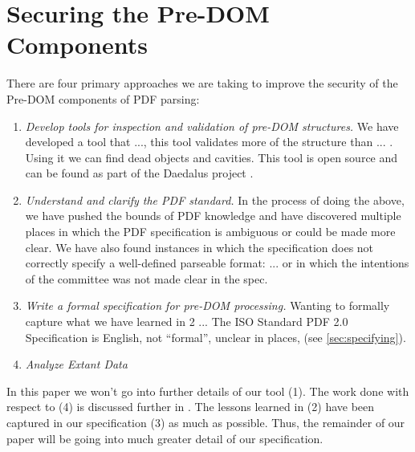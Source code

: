 \section{Securing the Pre-DOM Components }
\label{sec:securing}


There are four primary approaches we are taking to improve the security of the
Pre-DOM components of PDF parsing:
\begin{enumerate}
\item
  \emph{Develop tools for inspection and validation of pre-DOM structures.}
  We have developed a tool that ..., this tool validates more of the structure
  than ... .  Using it we can find dead objects and cavities.
  This tool is open source and can be found as part of the Daedalus
  project \cite{daedalus-url}.
 
\item
  \emph{Understand and clarify the PDF standard.}
  In the process of doing the above, we have pushed the bounds
  of PDF knowledge and have discovered multiple places in which
  the PDF specification is ambiguous or could be made more clear.
  We have also found instances in which the specification
  does not correctly specify a well-defined parseable format:
  ... or in which the intentions of the committee was not made clear in
  the spec.
  
\item
  \emph{Write a formal specification for pre-DOM processing.}
  Wanting to formally capture what we have learned in 2 ...
  The ISO Standard PDF 2.0 Specification \cite{isotc171sc2wg8ISO32000220202020}
  is English, not ``formal'',
  unclear in places, 
  (see \cref{sec:specifying}).
  
\item
  \emph{Analyze Extant Data}
  
\end{enumerate}

In this paper we won't go into further details of our tool (1).
The work done with respect to (4) is discussed further
in \cite{icarus1,icarus2}.
The lessons learned in (2)
have been captured in our specification (3) as much as possible.
Thus, the remainder of our paper will be going into much greater detail of
our specification.
